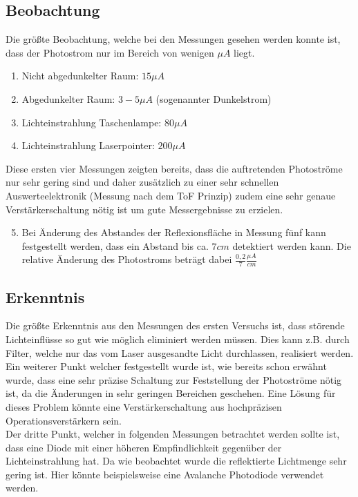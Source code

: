 \subsection{Beobachtung}
Die größte Beobachtung, welche bei den Messungen gesehen werden konnte ist, dass der Photostrom nur im Bereich von wenigen $\mu A$ liegt.
\begin{enumerate}
	\item Nicht abgedunkelter Raum: $15\mu A$ 
	\item Abgedunkelter Raum: $3-5\mu A$  (sogenannter Dunkelstrom)
	\item Lichteinstrahlung Taschenlampe: $80\mu A$ 
	\item Lichteinstrahlung Laserpointer: $200\mu A$
\end{enumerate}
Diese ersten vier Messungen zeigten bereits, dass die auftretenden Photoströme nur sehr gering sind und daher zusätzlich zu einer sehr schnellen Auswerteelektronik (Messung nach dem \ac{ToF} Prinzip) zudem eine sehr genaue Verstärkerschaltung nötig ist um gute Messergebnisse zu erzielen.
\begin{enumerate}
	\setcounter{enumi}{4}
	\item Bei Änderung des Abstandes der Reflexionsfläche in Messung fünf kann festgestellt werden, dass ein Abstand bis ca. $7cm$ detektiert werden kann. Die relative Änderung des Photostroms beträgt dabei $\frac{0,2}{7}\frac{\mu A}{cm}$
\end{enumerate}
\subsection{Erkenntnis}
Die größte Erkenntnis aus den Messungen des ersten Versuchs ist, dass störende Lichteinflüsse so gut wie möglich eliminiert werden müssen. Dies kann z.B. durch Filter, welche nur das vom Laser ausgesandte Licht durchlassen, realisiert werden.\\
Ein weiterer Punkt welcher festgestellt wurde ist, wie bereits schon erwähnt wurde, dass eine sehr präzise Schaltung zur Feststellung der Photoströme nötig ist, da die Änderungen in sehr geringen Bereichen geschehen. Eine Lösung für dieses Problem könnte eine Verstärkerschaltung aus hochpräzisen Operationsverstärkern sein.\\
Der dritte Punkt, welcher in folgenden Messungen betrachtet werden sollte ist, dass eine Diode mit einer höheren Empfindlichkeit gegenüber der Lichteinstrahlung hat. Da wie beobachtet wurde die reflektierte Lichtmenge sehr gering ist. Hier könnte beispielsweise eine Avalanche Photodiode verwendet werden.

